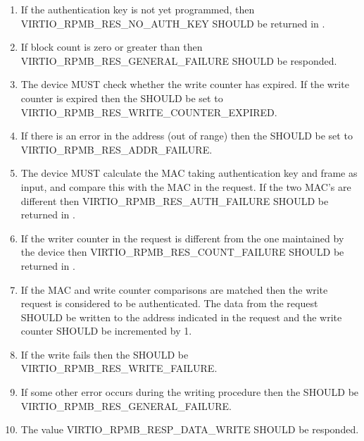 \begin{enumerate}
\item If the authentication key is not yet programmed,
   then VIRTIO_RPMB_RES_NO_AUTH_KEY SHOULD be returned in .

\item If block count is zero or greater than  then
   VIRTIO_RPMB_RES_GENERAL_FAILURE SHOULD be responded.

\item The device MUST check whether the write counter has expired.
  If the write counter is expired then the  SHOULD be set to
  VIRTIO_RPMB_RES_WRITE_COUNTER_EXPIRED.

\item If there is an error in the address (out of range) then the 
  SHOULD be set to VIRTIO_RPMB_RES_ADDR_FAILURE.

\item The device MUST calculate the MAC taking authentication key and frame as input,
  and compare this with the MAC in the request. If the two MAC’s are different
  then VIRTIO_RPMB_RES_AUTH_FAILURE SHOULD be returned in .

\item If the writer counter in the request is different from the one maintained
   by the device then VIRTIO_RPMB_RES_COUNT_FAILURE SHOULD  be returned in .

\item If the MAC and write counter comparisons are matched then the write request
   is considered to be authenticated. The data from the request SHOULD be written to the
   address indicated in the request and the write counter SHOULD be incremented by 1.

\item If the write fails then the  SHOULD be VIRTIO_RPMB_RES_WRITE_FAILURE.

\item If some other error occurs during the writing procedure then the 
   SHOULD be VIRTIO_RPMB_RES_GENERAL_FAILURE.

\item The  value VIRTIO_RPMB_RESP_DATA_WRITE SHOULD be responded.
\end{enumerate}


